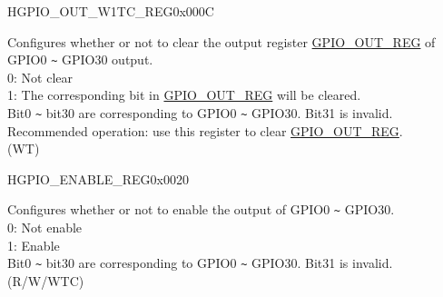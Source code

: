 \begin{register}{H}{GPIO\_OUT\_W1TC\_REG}{0x000C}\label{regdesc:GPIOOUTW1TCREG}
%
\regnewline%
\begin{regdesc}\begin{reglist}
\label{fielddesc:GPIOOUTW1TC}\item [GPIO\_OUT\_W1TC] Configures whether or not to clear the output register \hyperref[regdesc:GPIOOUTREG]{GPIO\_OUT\_REG} of GPIO0 \verb+~+ GPIO30 output.\\
0: Not clear\\
1: The corresponding bit in \hyperref[regdesc:GPIOOUTREG]{GPIO\_OUT\_REG} will be cleared.\\
Bit0 \verb+~+ bit30 are corresponding to GPIO0 \verb+~+ GPIO30. Bit31 is invalid.
Recommended operation: use this register to clear \hyperref[regdesc:GPIOOUTREG]{GPIO\_OUT\_REG}. \\
(WT)
\end{reglist}\end{regdesc}
\end{register}




\begin{register}{H}{GPIO\_ENABLE\_REG}{0x0020}\label{regdesc:GPIOENABLEREG}
%
\regnewline%
\begin{regdesc}\begin{reglist}
\label{fielddesc:GPIOENABLEDATA}\item [GPIO\_ENABLE\_DATA] Configures whether or not to enable the output of GPIO0 \verb+~+ GPIO30.\\
0: Not enable\\
1: Enable\\
Bit0 \verb+~+ bit30 are corresponding to GPIO0 \verb+~+ GPIO30. Bit31 is invalid.\\
(R/W/WTC)
\end{reglist}\end{regdesc}
\end{register}


